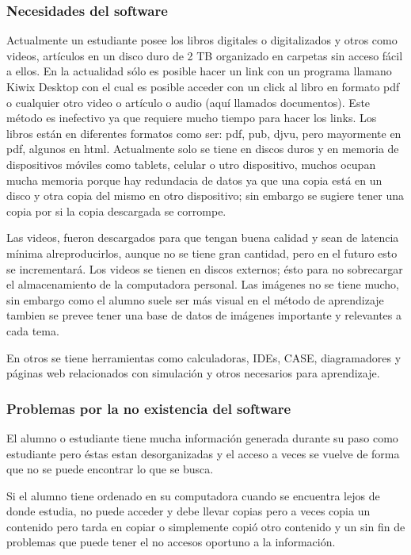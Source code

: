 \subsubsection{Necesidades del software}
Actualmente un estudiante posee los libros digitales o digitalizados y otros como videos, artículos en un disco duro de 2 TB organizado en carpetas sin acceso fácil a ellos. En la actualidad sólo es
posible hacer un link con un programa llamano Kiwix Desktop con el cual es posible acceder con un click al libro en formato pdf o cualquier otro video o artículo o audio (aquí llamados documentos). Este método es inefectivo ya que requiere mucho tiempo para hacer los links.
Los libros están en diferentes formatos como ser: pdf, pub, djvu, pero mayormente en pdf, algunos en html. Actualmente solo se tiene en discos duros y en memoria de dispositivos móviles como tablets, celular o utro dispositivo, muchos ocupan mucha memoria porque hay redundacia de datos ya que una copia está en un disco y otra copia del mismo en otro dispositivo; sin embargo se sugiere tener una copia por si la copia descargada se corrompe.

Las videos, fueron descargados para que tengan buena calidad y sean de latencia mínima alreproducirlos, aunque no se tiene gran cantidad, pero en el futuro esto se incrementará. Los videos se tienen en discos externos; ésto para no sobrecargar el almacenamiento de la computadora personal.
Las imágenes no se tiene mucho, sin embargo como el alumno suele ser más visual en el método de aprendizaje tambien se prevee tener una base de datos de imágenes importante y relevantes a cada tema.

En otros se tiene herramientas como calculadoras, IDEs, CASE, diagramadores y páginas web relacionados con simulación y otros necesarios para aprendizaje.
\subsubsection*{Problemas por la no existencia del software}
El alumno o estudiante tiene mucha información generada durante su paso como estudiante pero éstas estan desorganizadas y el acceso a veces se vuelve de forma que no se puede encontrar lo que se busca. 

Si el alumno tiene ordenado en su computadora cuando se encuentra lejos de donde estudia, no puede acceder y debe llevar copias pero a veces copia un contenido pero tarda en copiar o simplemente copió otro contenido y un sin fin de problemas que puede tener el no accesos oportuno a la información. 

